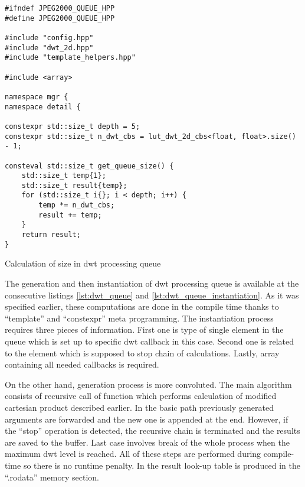 \begin{listing}[!htb]
\begin{verbatim}
#ifndef JPEG2000_QUEUE_HPP
#define JPEG2000_QUEUE_HPP

#include "config.hpp"
#include "dwt_2d.hpp"
#include "template_helpers.hpp"

#include <array>

namespace mgr {
namespace detail {

constexpr std::size_t depth = 5;
constexpr std::size_t n_dwt_cbs = lut_dwt_2d_cbs<float, float>.size() - 1;

consteval std::size_t get_queue_size() {
    std::size_t temp{1};
    std::size_t result{temp};
    for (std::size_t i{}; i < depth; i++) {
        temp *= n_dwt_cbs;
        result += temp;
    }
    return result;
}
\end{verbatim}
\caption{Calculation of size in dwt processing queue}
\label{lst:dwt_queue_size}
\end{listing}

The generation and then instantiation of dwt processing queue is available at the consecutive listings
\ref{lst:dwt_queue} and \ref{lst:dwt_queue_instantiation}. As it was specified earlier, these
computations are done in the compile time thanks to ``template'' and ``constexpr'' meta programming.
The instantiation process requires three pieces of information. First one is type of single
element in the queue which is set up to specific dwt callback in this case. Second one is related
to the element which is supposed to stop chain of calculations. Lastly, array containing all
needed callbacks is required.

On the other hand, generation process is more convoluted. The main algorithm consists of recursive
call of function which performs calculation of modified cartesian product described earlier.
In the basic path previously generated arguments are forwarded and the new one is appended
at the end. However, if the ``stop'' operation is detected, the recursive chain is terminated
and the results are saved to the buffer. Last case involves break of the whole process when
the maximum dwt level is reached. All of these steps are performed during compile-time so
there is no runtime penalty. In the result look-up table is produced in the ``.rodata''
memory section.

